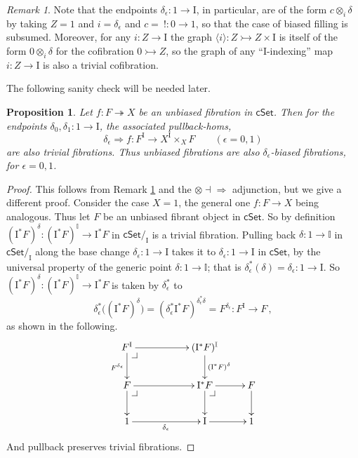 \documentclass[11pt,reqno]{amsart}
\makeatletter
\newcommand{\cSet}{\ensuremath{\mathsf{cSet}}}
\newcommand{\slice}[1]{\ensuremath{/_{\!{#1}}}}
\newcommand{\mono}{\ensuremath{\rightarrowtail}}
\newcommand{\ra}{\ensuremath{\rightarrow}}
\newcommand{\cof}{\ensuremath{\rightarrowtail}}
\newcommand{\fib}{\ensuremath{\twoheadrightarrow}}
\renewcommand{\to}{\ensuremath{\rightarrow}}
\newcommand{\too}{\ensuremath{\longrightarrow}}
\newcommand{\gph}[1]{\ensuremath{\langle #1 \rangle}}
\newcommand{\I}{\ensuremath{\mathrm{I}}}
\newcommand{\II}{\ensuremath{\mathbb{I}}}
\newtheorem{proposition}[theorem]{Proposition}
\theoremstyle{remark}
\newtheorem{remark}[theorem]{Remark}
\theoremstyle{definition}
\newcommand{\pbcorner}[1][dr]{\save*!/#1-1.2pc/#1:(-1,1)@^{|-}\restore}
\makeatother
\begin{document}
\begin{remark}\label{rem:specialtrivcofs}
Note that the endpoints $\delta_\epsilon : 1 \ra \I$, in particular, are of the form $c \otimes_i\!\delta$ by taking $Z = 1$ and $i = \delta_\epsilon$ and $c =\ ! : 0 \ra 1$, so that the case of biased filling is subsumed.  Moreover, for any $i : Z\to \I$ the graph $\gph{i}: Z \mono Z\times \I$ is itself of the form $0 \otimes_i\!\delta$ for the cofibration $0 \cof Z$, so the graph of any ``$\I$-indexing'' map $i : Z\to\I$ is also a trivial cofibration.
\end{remark}

The following sanity check will be needed later.
\begin{proposition}\label{prop:sanitycheck}
Let $f:F\fib X$ be an unbiased fibration in $\cSet$. Then for the endpoints $\delta_0, \delta_1 : 1 \to \I$, the associated pullback-homs,
\begin{equation}\label{eq:unbiasedimpliesbiased}
\delta_\epsilon \Rightarrow f : F^\I \to X^\I \times_X F \qquad(\epsilon = 0,1)
\end{equation}
are also trivial fibrations. Thus unbiased fibrations are also $\delta_\epsilon$-biased fibrations, for $\epsilon=0,1$.
%
\end{proposition}

\begin{proof}
This follows from Remark \ref{rem:specialtrivcofs} and the ${\otimes} \dashv {\Rightarrow}$ adjunction, but we give a different proof.
Consider the case $X=1$, the general one $f:F\to X$ being analogous. Thus let $F$ be an unbiased fibrant object in $\cSet$. So by definition $(\I^*F)^\delta : (\I^*F)^\II \too \I^*F$  in $\cSet\slice{\I}$ is a trivial fibration. 
Pulling back $\delta : 1\to \II$ in $\cSet\slice{\I}$ along the base change $\delta_\epsilon : 1\to \I$ takes it to $\delta_\epsilon : 1\to \I$ in $\cSet$, by the universal property of the generic point $\delta : 1\to \II$; that is $\delta_\epsilon^*(\delta) = \delta_\epsilon : 1 \to \I$.  So $(\I^*F)^\delta : (\I^*F)^\II \too \I^*F$ is taken by $\delta_\epsilon^*$ to
\[
\delta_\epsilon^* \big( {(\I^*F)^\delta} \big) =
(\delta_\epsilon^*\I^*F)^{\delta_\epsilon^*\delta} =  F^{\delta_\epsilon} : F^\I \too F\,,
\]
as shown in the following.
\begin{equation}\label{diagram:unbiasedfibration1}
\xymatrix{
F^\I \ar[d]_{F^{\delta_\epsilon}} \ar[rr] \pbcorner && (\I^* F)^{\II} \ar[d]^{(\I^*F)^{\delta}} &  \\
 F \ar[d] \ar[rr] \pbcorner && \I^*F \ar[d]  \ar[r] \pbcorner & F \ar[d]  \\
 1 \ar[rr]_{\delta_\epsilon} &&  \I \ar[r] & 1
}
\end{equation}
And pullback preserves trivial fibrations. 
\end{proof}
\end{document}
